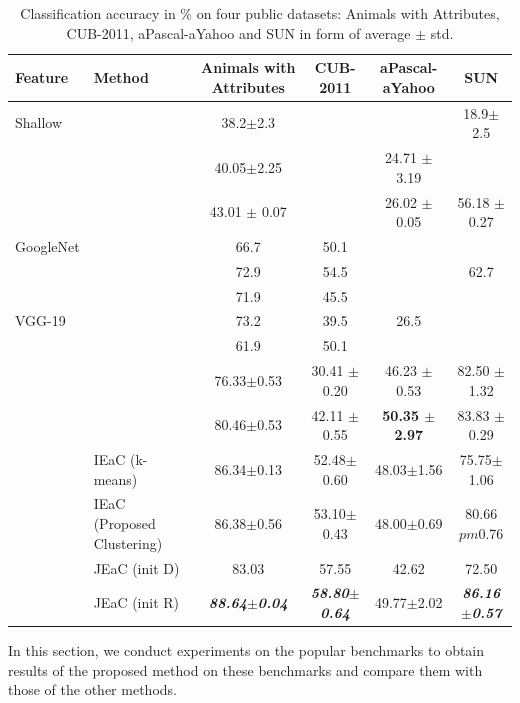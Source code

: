 \documentclass[letterpaper]{article}
\begin{document}
\begin{table}[ht]
\begin{minipage}{\textwidth}
\centering
\caption{Classification accuracy in \% on four public datasets: Animals with Attributes, CUB-2011, aPascal-aYahoo and SUN
in form of average $\pm$ std.
} \vspace{2mm} \label{tab:results}
\begin{tabular}{|l|l|c|c|c|c|}
\hline
Feature & Method & Animals with Attributes & CUB-2011 & aPascal-aYahoo & SUN \\
\hline
{Shallow}
&  \cite{li15max}                 &  38.2$\pm$2.3   &                 &                         & 18.9$\pm$2.5 \\
& \cite{semi15}                    &  40.05$\pm$2.25 &                 &   24.71 $\pm$3.19       &     \\
& \cite{jayaraman14}  &43.01 $\pm$ 0.07 &                 & 26.02 $\pm$ 0.05        & 56.18 $\pm$ 0.27 \\
\hline
{GoogleNet}
& \cite{Akata2015}              & 66.7            & 50.1            &                         & \\
& \cite{Synthesized}       & 72.9            & 54.5            &                         & 62.7 \\
& \cite{Xian2016}                & 71.9            & 45.5            &                         & \\
\hline
{VGG-19}
&  \cite{Kodirov2015}
                                            & 73.2            &  39.5           & 26.5                    &  \\
& \cite{Akata2015}              & 61.9            &  50.1           &                         & \\
&  \cite{sse}            &  76.33$\pm$0.53 & 30.41 $\pm$0.20 &   46.23 $\pm$ 0.53      & 82.50 $\pm$ 1.32    \\
& \cite{agnostic}       &  80.46$\pm$0.53 & 42.11 $\pm$0.55 &   \textbf{50.35 $\pm$ 2.97}      & 83.83 $\pm$ 0.29    \\

& IEaC (k-means)                             & 86.34$\pm$0.13               & 52.48$\pm$0.60              & 48.03$\pm$1.56              & 75.75$\pm$1.06 \\
& IEaC (Proposed Clustering)                             & 86.38$\pm$0.56               & 53.10$\pm$0.43              & 48.00$\pm$0.69              & 80.66$pm$0.76 \\
& JEaC (init D)                     & 83.03                        & 57.55                       & 42.62          & 72.50\\
& JEaC (init R)                     & \textbf{\em 88.64$\pm$0.04}  & \textbf{\em 58.80$\pm$0.64} & 49.77$\pm$2.02 & \textbf{\em 86.16$\pm$0.57} \\
\hline
\end{tabular}
\end{minipage}\vspace{-3mm}
\end{table}
In this section, we conduct experiments on the popular benchmarks to obtain results of the proposed method on these benchmarks and compare them with those of the other methods.
\end{document}
